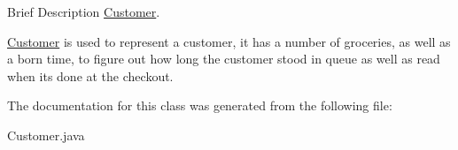 Brief Description \hyperlink{class_customer}{Customer}. 

\hyperlink{class_customer}{Customer} is used to represent a customer, it has a number of groceries, as well as a born time, to figure out how long the customer stood in queue as well as read when it\textquotesingle{}s done at the checkout. 

The documentation for this class was generated from the following file\+:\begin{DoxyCompactItemize}
\item 
Customer.\+java\end{DoxyCompactItemize}
